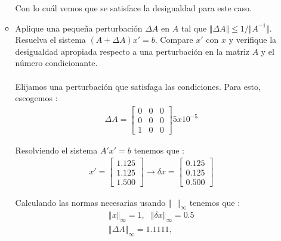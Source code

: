 \documentclass{article}
\begin{document}
\begin{enumerate}
\begin{itemize}
Con lo cu\'al vemos que se satisface la desigualdad para este caso.

\item Aplique una pequeña perturbaci\'on $\Delta A$ en $A$ tal que 
$ \Vert \Delta A \Vert \leq 1 / \Vert A^{-1} \Vert $. Resuelva el sistema 
$ ( A + \Delta A ) x' = b $. Compare $x'$ con $x$ y verifique la desigualdad apropiada respecto a una perturbaci\'on en la matriz $A$ y el n\'umero condicionante.\\
\\
Elijamos una perturbaci\'on que satisfaga las condiciones. Para esto, escogemos :
\begin{gather*}
\Delta A = 
	\begin{bmatrix}
		0 & 0 & 0 \\
		0 & 0 & 0 \\
		1 & 0 & 0
	\end{bmatrix}  5 x 10^{-5}
\end{gather*}

Resolviendo el sistema $A'x' = b$ tenemos que :
\begin{gather*}
x' = 
	\begin{bmatrix}
		1.125 \\
		1.125 \\
		1.500
	\end{bmatrix}
\rightarrow
\delta x = 
	\begin{bmatrix}
		0.125 \\
		0.125 \\
		0.500
	\end{bmatrix}
\end{gather*}

Calculando las normas necesarias usando $\Vert \textit{ } \Vert_{\infty}$ tenemos que :
\begin{gather*}
\Vert x \Vert_{\infty} = 1,\textit{ }
\Vert \delta x \Vert_{\infty} = 0.5 \\
\Vert  \Delta A \Vert_{\infty} = 1.1111,\textit{ }
\end{gather*}


\end{itemize}
\end{enumerate}
\end{document}
